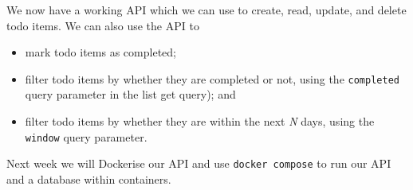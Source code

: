 \documentclass{csse4400}
\begin{document}
We now have a working API which we can use to create, read, update, and delete todo items.
We can also use the API to
\begin{itemize}
  \item mark todo items as completed;
  \item filter todo items by whether they are completed or not,
        using the \texttt{completed} query parameter in the list get query); and
  \item filter todo items by whether they are within the next \textit{N} days,
        using the \texttt{window} query parameter.
\end{itemize}

Next week we will Dockerise our API and use \texttt{docker compose} to run our API and a database within containers.




\end{document}
